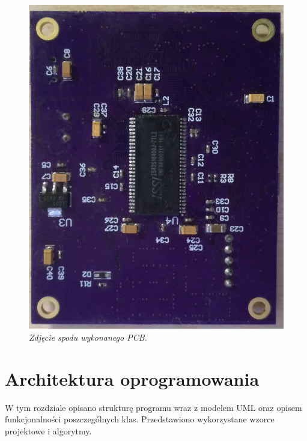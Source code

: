 \documentclass[eng,printmode]{mgr}
\begin{document}
\begin{center}\centering
\begin{figure}[!h]
\vskip 1cm
    \centering
    \includegraphics[width=\textwidth]{images/bottomPcb.jpg}
    \caption{\textit{Zdjęcie spodu wykonanego PCB.}}
\end{figure}
\end{center}

\chapter{ Architektura oprogramowania}

W tym rozdziale opisano strukturę programu wraz z modelem UML oraz opisem funkcjonalności poszczególnych klas. Przedstawiono wykorzystane wzorce projektowe i algorytmy.
\end{document}
